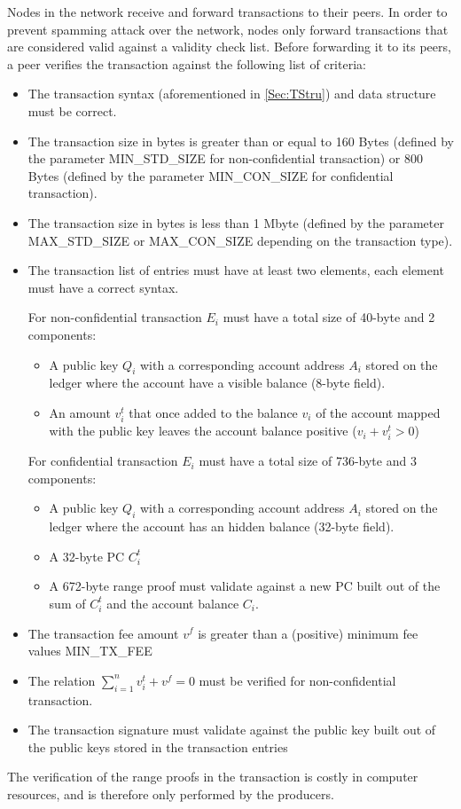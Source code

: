 Nodes in the network receive and forward transactions to their peers. In order to prevent spamming attack over the network, nodes only forward transactions that are considered valid against a validity check list. Before forwarding it to its peers, a peer verifies the transaction against the following list of criteria:
 
\begin{itemize}
\item The transaction syntax (aforementioned in \ref{Sec:TStru}) and data structure must be correct.
\item The transaction size in bytes is greater than or equal to 160 Bytes (defined by the parameter MIN\_STD\_SIZE for non-confidential transaction) or 800 Bytes (defined by the parameter MIN\_CON\_SIZE for confidential transaction).
\item The transaction size in bytes is less than 1 Mbyte (defined by the parameter MAX\_STD\_SIZE or MAX\_CON\_SIZE depending on the transaction type).
\item The transaction list of entries must have at least two elements, each element must have a correct syntax. 

For non-confidential transaction $E_i$ must have a total size of 40-byte and 2 components:
\begin{itemize}
\item A public key $Q_i$ with a corresponding account address $A_i$ stored on the ledger where the account have a visible balance (8-byte field).
\item An amount $v_i^t$ that once added to the balance $v_i$ of the account mapped with the public key leaves the account balance positive ($v_i+v_i^t > 0$)
\end{itemize}
For confidential transaction $E_i$ must have a total size of 736-byte and 3 components:

\begin{itemize}
\item A public key $Q_i$ with a corresponding account address $A_i$ stored on the ledger where the account has an hidden balance (32-byte field).
\item A 32-byte PC $C_i^t$ 
\item A 672-byte range proof must validate against a new PC built out of the sum of $C_i^t$ and the account balance $C_i$. 
\end{itemize}

\item The transaction fee amount $v^f$ is greater than a (positive) minimum fee values MIN\_TX\_FEE
\item The relation $\sum_{i=1}^{n}v^t_i + v^f = 0$ must be verified for non-confidential transaction.
\item The transaction signature must validate against the public key built out of the public keys stored in the transaction entries 
\end{itemize}

The verification of the range proofs in the transaction is costly in computer resources, and is therefore only performed by the producers. 
